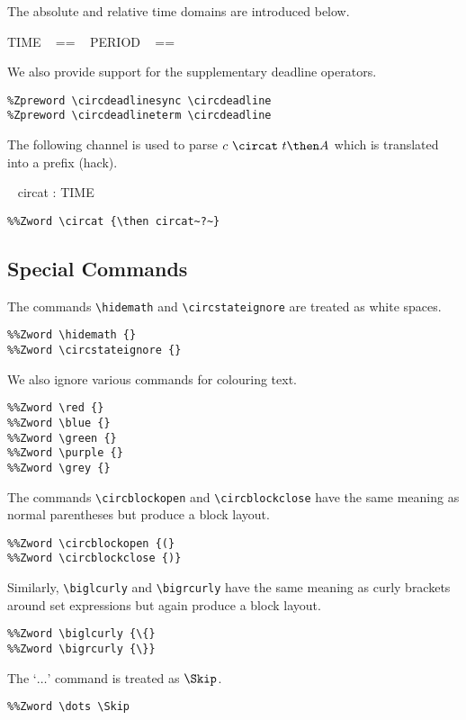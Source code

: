 The absolute and relative time domains are introduced below.
%
\begin{zed}
  TIME ~ == ~ \nat
  \also
  PERIOD ~ == ~ \nat
\end{zed}

\nid
We also provide support for the supplementary {\SCJCircus} deadline operators.
%
\begin{verbatim}
%Zpreword \circdeadlinesync \circdeadline
%Zpreword \circdeadlineterm \circdeadline
\end{verbatim}

\nid
The following channel is used to parse $c~\circat~t \then A$ which is translated into a prefix (hack).
%
\begin{circus}
  \circchannel ~ circat : TIME
\end{circus}
%
\begin{verbatim}
%%Zword \circat {\then circat~?~}
\end{verbatim}

\subsection{Special Commands}

The commands \verb"\hidemath" and \verb"\circstateignore" are treated as white spaces.
%
\begin{verbatim}
%%Zword \hidemath {}
%%Zword \circstateignore {}
\end{verbatim}

\nid
We also ignore various commands for colouring text.
%
\begin{verbatim}
%%Zword \red {}
%%Zword \blue {}
%%Zword \green {}
%%Zword \purple {}
%%Zword \grey {}
\end{verbatim}

\nid
The commands \verb"\circblockopen" and \verb"\circblockclose" have the same meaning as normal parentheses but produce a block layout.
%
\begin{verbatim}
%%Zword \circblockopen {(}
%%Zword \circblockclose {)}
\end{verbatim}

\nid
Similarly, \verb"\biglcurly" and \verb"\bigrcurly" have the same meaning as curly brackets around set expressions but again produce a block layout.
%
\begin{verbatim}
%%Zword \biglcurly {\{}
%%Zword \bigrcurly {\}}
\end{verbatim}

\nid The `$\dots$' command is treated as $\Skip$.

\begin{verbatim}
%%Zword \dots \Skip
\end{verbatim}
